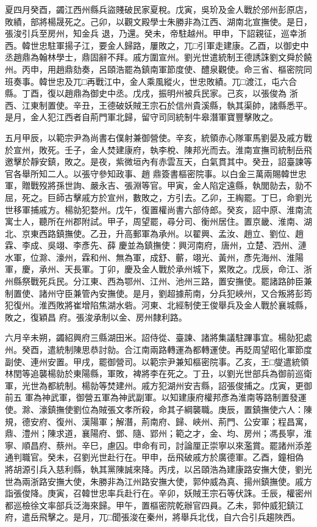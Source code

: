 \begin{pinyinscope}
 夏四月癸酉，蠲江西州縣兵盜賤破民家夏稅。戊寅，吳玠及金人戰於邠州彭原店，敗績，部將楊晟死之。己卯，以觀文殿學士朱勝非為江西、湖南北宣撫使。是日，張浚引兵至房州，知金兵
 退，乃還。癸未，帝駐越州。甲申，下詔親征，巡幸浙西。韓世忠駐軍揚子江，要金人歸路，屢敗之，兀□引軍走建康。乙酉，以御史中丞趙鼎為翰林學士，鼎固辭不拜。戚方圍宣州。劉光世遣統制王德誘誅劉文舜於饒州。丙申，用趙鼎劾奏，呂頤浩罷為鎮南軍節度使、醴泉觀使。命三省、樞密院同班奏事。韓世忠及兀□再戰江中，金人乘風縱火，世忠敗績。兀□渡江，屯六合縣。丁酉，復以趙鼎為御史中丞。戊戌，振明州被兵民家。己亥，以張俊為
 浙西、江東制置使。辛丑，王德破妖賊王宗石於信州貴溪縣，執其渠帥，諸縣悉平。是月，金人犯江西者自荊門軍北歸，留守司同統制牛皋潛軍寶豐擊敗之。



 五月甲辰，以範宗尹為尚書右僕射兼御營使。辛亥，統領赤心隊軍馬劉晏及戚方戰於宣州，敗死。壬子，金人焚建康府，執李梲、陳邦光而去。淮南宣撫司統制岳飛邀擊於靜安鎮，敗之。是夜，紫微垣內有赤雲亙天，白氣貫其中。癸丑，詔臺諫等官各舉所知二人。以張守參知政事、趙
 鼎簽書樞密院事。以白金三萬兩賜韓世忠軍，贈戰歿將孫世詢、嚴永吉、張淵等官。甲寅，金人陷定遠縣，執閭勍去，勍不屈，死之。巨師古擊戚方於宣州，數敗之，方引去。乙卯，王綯罷。丁巳，命劉光世移軍捕戚方。楊勍犯婺州。戊午，復置權尚書六部侍郎。癸亥，詔中原、淮南流寓士人，聽所在州郡附試。甲子，周望罷，尋分司、衡州居住。置京畿、淮南、湖北、京東西路鎮撫使。乙丑，升高郵軍為承州。以翟興、孟汝、趙立、劉位、趙霖、李成、吳翊、李彥先、薛
 慶並為鎮撫使：興河南府，唐州，立楚、泗州、漣水軍，位滁、濠州，霖和州、無為軍，成舒、蘄，翊光、黃州，彥先海州、淮陽軍，慶，承州、天長軍。丁卯，慶及金人戰於承州城下，累敗之。戊辰，命江、浙州縣祭戰死兵民。分江東、西為鄂州、江州、池州三路，置安撫使。罷諸路帥臣兼制置使、諸州守臣兼管內安撫使。是月，劉超據荊南，分兵犯峽州，又合叛將彭筠犯復州。淮西敗將崔增陷焦湖水砦。河東、北經制使王俊舉兵及金人戰於襄城縣，敗之，復穎昌
 府。張浚承制以金、房州隸利路。



 六月辛未朔，蠲紹興府三縣湖田米。詔侍從、臺諫、諸將集議駐蹕事宜。楊勍犯處州。癸酉，遣統制陳思恭討勍。合江南兩路轉運為都轉運使。再貶周望昭化軍節度副使、連州安置。甲戌，罷御營司。以範宗尹兼知樞密院事。乙亥，王□燮遣統領林閏等追襲楊勍於東陽縣，軍敗，裨將李在死之。丁丑，以劉光世部兵為御前巡衛軍，光世為都統制。楊勍等焚建州。戚方犯湖州安吉縣，詔張俊捕之。戊寅，更御前五
 軍為神武軍，御營五軍為神武副軍。以知建康府權邦彥為淮南等路制置發運使。滁、濠鎮撫使劉位為賊張文孝所殺，命其子綱襲職。庚辰，置鎮撫使六人：陳規，德安府、復州、漢陽軍；解潛，荊南府、歸、峽州、荊門、公安軍；程昌寓，鼎、澧州；陳求道，襄陽府、鄧、隨、郢州；範之才，金、均、房州；馮長寧，淮寧、順昌府、蔡州。辛巳，慮囚。申命有司，討論厘正崇寧以來濫賞。罷諸州添差通判職官。癸未，召劉光世赴行在。甲申，岳飛破戚方於廣德軍。乙酉，鐘相偽
 將胡源引兵入慈利縣，執其黨陳誠來降。丙戌，以呂頤浩為建康路安撫大使，劉光世為兩浙路安撫大使，朱勝非為江州路安撫大使，郭仲威為真、揚州鎮撫使。戚方詣張俊降。庚寅，召韓世忠率兵赴行在。辛卯，妖賊王宗石等伏誅。壬辰，權密州都巡檢徐文率部兵泛海來歸。甲午，置樞密院乾辦官四員。乙未，郭仲威犯鎮江府，遣岳飛擊之。是月，兀□聞張浚在秦州，將舉兵北伐，自六合引兵趨陜西。




\end{pinyinscope}
